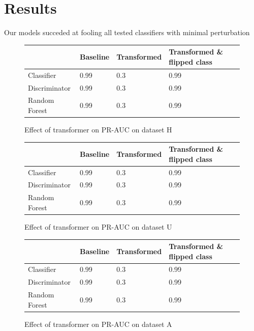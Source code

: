 \section{Results}
Our models succeded at fooling all tested classifiers with minimal perturbation
\begin{figure}[H]
    \centering
    \begin{tabularx}{0.5\textwidth}{ X X X X }
      \toprule
        & Baseline & Transformed & Transformed \& flipped class \\
      \midrule
      Classifier  & 0.99  & 0.3  & 0.99  \\
      Discriminator & 0.99  & 0.3  & 0.99  \\
      Random Forest & 0.99  & 0.3  & 0.99  \\
      \bottomrule
    \end{tabularx}
    \caption{\label{fig:results-pr-auc-h} Effect of transformer on PR-AUC on dataset H} 
\end{figure}
\begin{figure}[H]
    \centering
    \begin{tabularx}{0.5\textwidth}{ X X X X }
      \toprule
        & Baseline & Transformed & Transformed \& flipped class \\
      \midrule
      Classifier  & 0.99  & 0.3  & 0.99  \\
      Discriminator & 0.99  & 0.3  & 0.99  \\
      Random Forest & 0.99  & 0.3  & 0.99  \\
      \bottomrule
    \end{tabularx}
    \caption{\label{fig:results-pr-auc-u} Effect of transformer on PR-AUC on dataset U} 
\end{figure}
\begin{figure}[H]
    \centering
    \begin{tabularx}{0.5\textwidth}{ X X X X }
      \toprule
        & Baseline & Transformed & Transformed \& flipped class \\
      \midrule
      Classifier  & 0.99  & 0.3  & 0.99  \\
      Discriminator & 0.99  & 0.3  & 0.99  \\
      Random Forest & 0.99  & 0.3  & 0.99  \\
      \bottomrule
    \end{tabularx}
    \caption{\label{fig:results-pr-auc-a} Effect of transformer on PR-AUC on dataset A} 
\end{figure}

